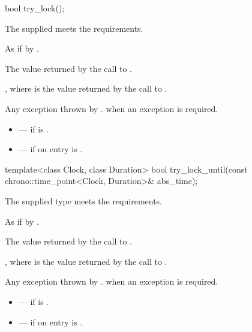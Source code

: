 %
\begin{itemdecl}
bool try_lock();
\end{itemdecl}

\begin{itemdescr}
\pnum
\expects
The supplied  meets the 
requirements.

\pnum
\effects
As if by .

\pnum
\returns
The value returned by the call to .

\pnum
\ensures
{}, where  is the value returned by
the call to .

\pnum
\throws
Any exception thrown by .  when an exception
is required.

\pnum
\errors
\begin{itemize}
\item {} --- if  is .
\item {} --- if on entry 
is .
\end{itemize}
\end{itemdescr}

%
\begin{itemdecl}
template<class Clock, class Duration>
  bool try_lock_until(const chrono::time_point<Clock, Duration>& abs_time);
\end{itemdecl}

\begin{itemdescr}
\pnum
\expects
The supplied  type meets the 
requirements.

\pnum
\effects
As if by .

\pnum
\returns
The value returned by the call to .

\pnum
\ensures
{}, where  is the value returned by
the call to .

\pnum
\throws
Any exception thrown by .  when an
exception is required.

\pnum
\errors
\begin{itemize}
\item {} --- if  is .
\item {} --- if on entry  is
.
\end{itemize}
\end{itemdescr}

